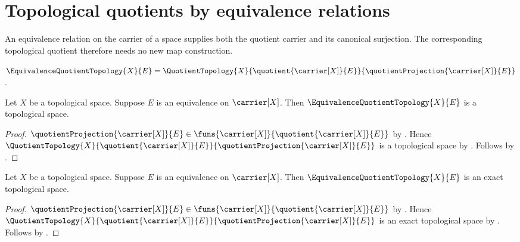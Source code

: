 \section{Topological quotients by equivalence relations}




An equivalence relation on the carrier of a space supplies both the quotient
carrier and its canonical surjection.  The corresponding topological
quotient therefore needs no new map construction.

\begin{definition}\label{equivalence_quotient_topology}
    $\EquivalenceQuotientTopology{X}{E}
        =\QuotientTopology{X}{\quotient{\carrier[X]}{E}}{
            \quotientProjection{\carrier[X]}{E}}$.
\end{definition}

\begin{theorem}\label{equivalence_quotient_topology_is_topological_space}
    Let $X$ be a topological space.
    Suppose $E$ is an equivalence on $\carrier[X]$.
    Then $\EquivalenceQuotientTopology{X}{E}$ is a topological space.
\end{theorem}
\begin{proof}
    $\quotientProjection{\carrier[X]}{E}\in
        \funs{\carrier[X]}{\quotient{\carrier[X]}{E}}$ by
        .
    Hence $\QuotientTopology{X}{\quotient{\carrier[X]}{E}}{
        \quotientProjection{\carrier[X]}{E}}$ is a topological space by
        .
    Follows by .
\end{proof}

\begin{theorem}\label{equivalence_quotient_topology_is_exact}
    Let $X$ be a topological space.
    Suppose $E$ is an equivalence on $\carrier[X]$.
    Then $\EquivalenceQuotientTopology{X}{E}$ is an exact topological
        space.
\end{theorem}
\begin{proof}
    $\quotientProjection{\carrier[X]}{E}\in
        \funs{\carrier[X]}{\quotient{\carrier[X]}{E}}$ by
        .
    Hence $\QuotientTopology{X}{\quotient{\carrier[X]}{E}}{
        \quotientProjection{\carrier[X]}{E}}$
        is an exact topological space by
        .
    Follows by .
\end{proof}

